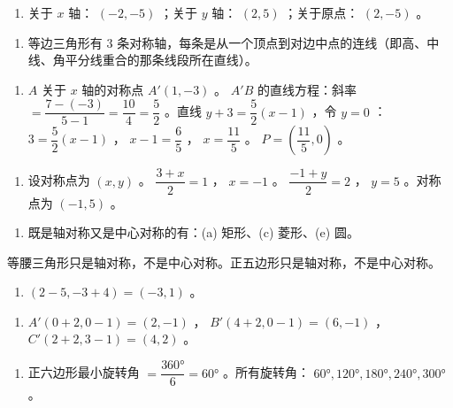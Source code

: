 \begin{answer}


\begin{enumerate}
  \item 关于 $x$ 轴： $(-2, -5)$ ；关于 $y$ 轴： $(2, 5)$ ；关于原点： $(2, -5)$ 。
\end{enumerate}


\begin{enumerate}
  \item 等边三角形有 $3$ 条对称轴，每条是从一个顶点到对边中点的连线（即高、中线、角平分线重合的那条线段所在直线）。
\end{enumerate}


\begin{enumerate}
  \item $A$ 关于 $x$ 轴的对称点 $A'(1, -3)$ 。 $A'B$ 的直线方程：斜率 $= \dfrac{7-(-3)}{5-1} = \dfrac{10}{4} = \dfrac{5}{2}$ 。直线 $y + 3 = \dfrac{5}{2}(x - 1)$ ，令 $y = 0$ ： $3 = \dfrac{5}{2}(x-1)$ ， $x - 1 = \dfrac{6}{5}$ ， $x = \dfrac{11}{5}$ 。 $P = \left(\dfrac{11}{5}, 0\right)$ 。
\end{enumerate}


\begin{enumerate}
  \item 设对称点为 $(x, y)$ 。 $\dfrac{3+x}{2} = 1$ ， $x = -1$ 。 $\dfrac{-1+y}{2} = 2$ ， $y = 5$ 。对称点为 $(-1, 5)$ 。
\end{enumerate}


\begin{enumerate}
  \item 既是轴对称又是中心对称的有：(a) 矩形、(c) 菱形、(e) 圆。
\end{enumerate}

   等腰三角形只是轴对称，不是中心对称。正五边形只是轴对称，不是中心对称。

\begin{enumerate}
  \item $(2 - 5, -3 + 4) = (-3, 1)$ 。
\end{enumerate}


\begin{enumerate}
  \item $A'(0 + 2, 0 - 1) = (2, -1)$ ， $B'(4 + 2, 0 - 1) = (6, -1)$ ， $C'(2 + 2, 3 - 1) = (4, 2)$ 。
\end{enumerate}


\begin{enumerate}
  \item 正六边形最小旋转角 $= \dfrac{360°}{6} = 60°$ 。所有旋转角： $60°, 120°, 180°, 240°, 300°$ 。
\end{enumerate}



\end{answer}
